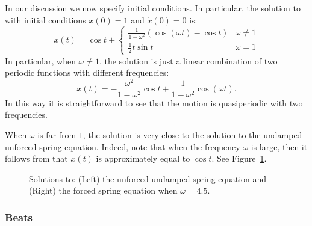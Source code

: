 \documentclass{ximera}
\begin{document}
In our discussion we now specify initial conditions.  In particular, the 
solution to  with initial conditions $x(0)=1$ and 
$\dot{x}(0)=0$ is:
\arraystart
\begin{equation}  \label{e:x(t)reson}
x(t) = \cos t + \left\{\begin{array}{ll}
\frac{1}{1-\omega ^2}(\cos(\omega t)-\cos t) & \omega \neq 1 \\
\frac{1}{2}t\sin t & \omega=1  \end{array}\right.
\end{equation}
\arrayfinish
In particular, when $\omega\neq 1$, the solution  is
just a linear combination of two periodic 
functions with different 
frequencies:
\begin{equation} \label{e:x(t)reson2}
x(t) = -\frac{\omega^2}{1-\omega ^2} \cos t + \frac{1}{1-\omega ^2}\cos(\omega t).
\end{equation}
In this way it is straightforward to see that the motion is 
quasiperiodic
with two frequencies.

When $\omega$ is far from $1$, the solution is very close to the solution
to the undamped unforced spring equation.  
Indeed, note that when the frequency
$\omega$ is large, then it follows from  that $x(t)$ is 
approximately equal to $\cos t$.  See Figure~\ref{F:nonreson}.
\begin{figure}[htb]
           \centerline{%
           }
           \caption{Solutions to: (Left) the unforced undamped spring
        equation and (Right) the forced spring equation when $\omega =4.5$.}
           \label{F:nonreson}
\end{figure}

\subsubsection*{Beats}
\end{document}
